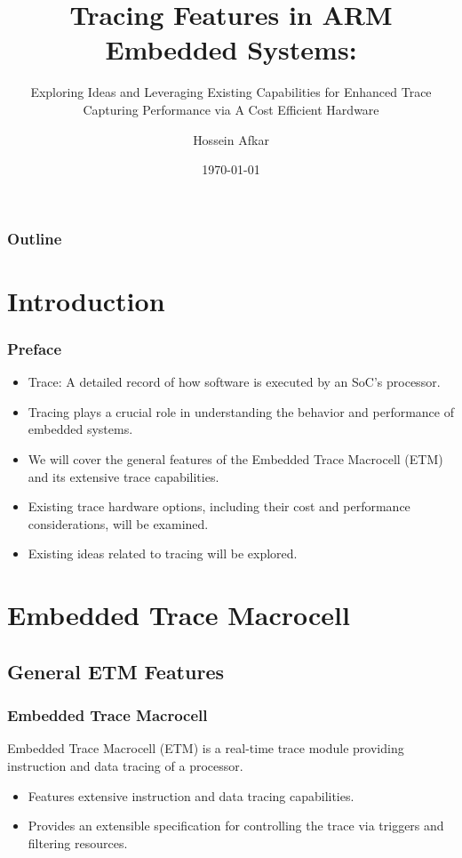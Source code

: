 \documentclass{beamer}
\title[Tracing Features in ARM]{Tracing Features in ARM Embedded Systems:}
\subtitle{Exploring Ideas and Leveraging Existing Capabilities for Enhanced
Trace Capturing Performance via A Cost Efficient Hardware}
\author[]{Hossein Afkar}
\institute{DRTS Lab}
\date{\today}
\begin{document}
\frame{\titlepage}

\begin{frame}
    \frametitle{Outline}
    \tableofcontents[hideallsubsections]
\end{frame}



\section{Introduction}
\begin{frame}
    \frametitle{Preface}
    \begin{itemize}
        \item Trace: A detailed record of how software is
            executed by an SoC's processor.
        \item Tracing plays a crucial role in understanding the
            behavior and performance of embedded systems.
        \item We will cover the general features of the Embedded Trace
            Macrocell (ETM) and its extensive trace capabilities.
        \item Existing trace hardware options, including their cost and
            performance considerations, will be examined.
        \item Existing ideas related to tracing will be explored.
    \end{itemize}
\end{frame}

\section{Embedded Trace Macrocell}
\subsection{General ETM Features}
\begin{frame}
    \frametitle{Embedded Trace Macrocell}
    Embedded Trace Macrocell (ETM) is a real-time trace module providing
    instruction and data tracing of a processor.
    \begin{itemize}
        \item Features extensive instruction and data tracing capabilities.
        \item Provides an extensible specification for controlling the trace
            via triggers and filtering resources.
    \end{itemize}
\end{frame}
\end{document}
